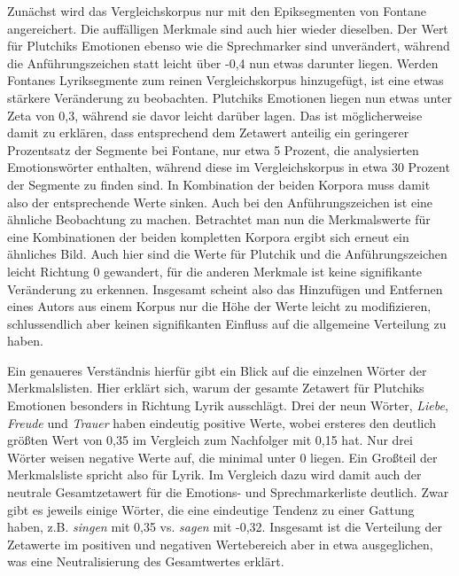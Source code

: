 \documentclass[a4paper,10p]{article}
\begin{document}
Zunächst wird das Vergleichskorpus nur mit den Epiksegmenten von Fontane angereichert. Die auffälligen Merkmale sind auch hier wieder dieselben. Der Wert für Plutchiks Emotionen ebenso wie die Sprechmarker sind unverändert, während die Anführungszeichen statt leicht über -0,4 nun etwas darunter liegen. Werden Fontanes Lyriksegmente zum reinen Vergleichskorpus hinzugefügt, ist eine etwas stärkere Veränderung zu beobachten. Plutchiks Emotionen liegen nun etwas unter Zeta von 0,3, während sie davor leicht darüber lagen. Das ist möglicherweise damit zu erklären, dass entsprechend dem Zetawert anteilig ein geringerer Prozentsatz der Segmente bei Fontane, nur etwa 5 Prozent, die analysierten Emotionswörter enthalten, während diese im Vergleichskorpus in etwa 30 Prozent der Segmente zu finden sind. In Kombination der beiden Korpora muss damit also der entsprechende Werte sinken. Auch bei den Anführungszeichen ist eine ähnliche Beobachtung zu machen. Betrachtet man nun die Merkmalswerte für eine Kombinationen der beiden kompletten Korpora ergibt sich erneut ein ähnliches Bild. Auch hier sind die Werte für Plutchik und die Anführungszeichen leicht Richtung 0 gewandert, für die anderen Merkmale ist keine signifikante Veränderung zu erkennen. Insgesamt scheint also das Hinzufügen und Entfernen eines Autors aus einem Korpus nur die Höhe der Werte leicht zu modifizieren, schlussendlich aber keinen signifikanten Einfluss auf die allgemeine Verteilung zu haben. \par 

Ein genaueres Verständnis hierfür gibt ein Blick auf die einzelnen Wörter der Merkmalslisten. Hier erklärt sich, warum der gesamte Zetawert für Plutchiks Emotionen besonders in Richtung Lyrik ausschlägt. Drei der neun Wörter, \textit{Liebe}, \textit{Freude} und \textit{Trauer} haben eindeutig positive Werte, wobei ersteres den deutlich größten Wert von 0,35 im Vergleich zum Nachfolger mit 0,15 hat. Nur drei Wörter weisen negative Werte auf, die minimal unter 0 liegen. Ein Großteil der Merkmalsliste spricht also für Lyrik. Im Vergleich dazu wird damit auch der neutrale Gesamtzetawert für die Emotions- und Sprechmarkerliste deutlich. Zwar gibt es jeweils einige Wörter, die eine eindeutige Tendenz zu einer Gattung haben, z.B. \textit{singen} mit 0,35 vs. \textit{sagen} mit -0,32. Insgesamt ist die Verteilung der Zetawerte im positiven und negativen Wertebereich aber in etwa ausgeglichen, was eine Neutralisierung des Gesamtwertes erklärt. \par 
\end{document}
